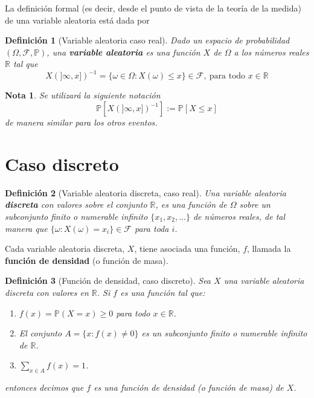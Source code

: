 \documentclass[11pt]{report}
\theoremstyle{break}
\newtheorem{definicion}{Definición}[chapter]
\newtheorem{nota}{Nota}[chapter]
\theoremstyle{break}
\begin{document}
La definición formal (es decir, desde el punto de vista de la teoría de la medida) de una variable aleatoria está dada por

\begin{definicion}[Variable aleatoria caso real]
\label{definicion: variable aleatoria caso real}
Dado un espacio de probabilidad $(\Omega, \mathcal{F}, \mathbb{P})$, una \textbf{variable aleatoria} es una función $X$ de $\Omega$ a los números reales $\mathbb{R}$ tal que
$$
X(]\infty, x])^{-1} = \{\omega  \in \Omega: X(\omega) \leq x  \} \in \mathcal{F}, \medspace \mbox{para todo } x \in \mathbb{R}
$$
\end{definicion}
\begin{nota}
\label{nota: notacion probabilidades}
Se utilizará la siguiente notación
$$
\mathbb{P}[X(]\infty, x])^{-1}] :=\mathbb{P}[X \leq x]
$$
de manera similar para los otros eventos.
\end{nota}

\section{Caso discreto}
\label{seccion:variables discretas}
\begin{definicion}[Variable aleatoria discreta, caso real]
Una variable aleatoria \textbf{discreta} con valores sobre el conjunto $\mathbb{R}$, es una función de $\Omega$ sobre un subconjunto finito o numerable infinito $\{x_1, x_2, \ldots\}$ de números reales, de tal manera que $\{\omega: X(\omega) = x_i \} \in \mathcal{F}$ para toda $i$.
\end{definicion}
Cada variable aleatoria discreta, $X$, tiene asociada una función, $f$, llamada la \textbf{función de densidad} (o función de masa).

\begin{definicion}[Función de densidad, caso discreto]
\label{definicion:funcion de densidad, caso discreto}
Sea $X$ una variable aleatoria discreta con valores en $\mathbb{R}$. Si $f$ es una función tal que:
\begin{enumerate}[label=\alph*)]
\item $f(x) = \mathbb{P}(X = x) \geq 0$ para todo $x \in \mathbb{R}$.
\item El conjunto $A = \{x: f(x) \neq 0 \}$ es un subconjunto finito o numerable infinito de $\mathbb{R}$.
\item $\sum_{x \in A} f(x) = 1$.
\end{enumerate}
entonces decimos que $f$ es una función de densidad (o función de masa) de $X$.
\end{definicion}
\end{document}
